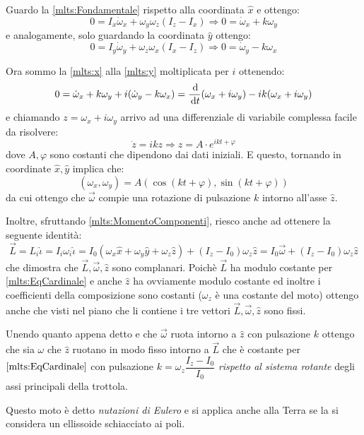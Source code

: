 \documentclass[../main.tex]{subfiles}
\begin{document}
Guardo la \cref{mlts:Fondamentale} rispetto alla coordinata $\hat x$ e ottengo:
\begin{equation}\label{mlts:x}
	0=I_x\dot\omega_x+\omega_y\omega_z(I_z-I_x)\Rightarrow 0=\dot\omega_x+k\omega_y
\end{equation}
e analogamente, solo guardando la coordinata $\hat y$ ottengo:
\begin{equation}\label{mlts:y}
	0=I_y\dot\omega_y+\omega_z\omega_x(I_x-I_z)\Rightarrow 0=\dot\omega_y-k\omega_x
\end{equation}

Ora sommo la \cref{mlts:x} alla \cref{mlts:y} moltiplicata per $i$ ottenendo:
\begin{equation*}
	0=\dot\omega_x+k\omega_y+i(\dot\omega_y-k\omega_x)=\frac{\,\mathrm{d}}{\,\mathrm{d} t}(\omega_x+i\omega_y)-ik(\omega_x+i\omega_y)
\end{equation*}
e chiamando $z=\omega_x+i\omega_y$ arrivo ad una differenziale di variabile complessa facile da risolvere:
\begin{equation*}
	\dot z=ikz \Rightarrow z=A\cdot e^{ikt+\varphi}
\end{equation*}
dove $A,\varphi$ sono costanti che dipendono dai dati iniziali. E questo, tornando in coordinate $\hat x,\hat y$ implica che:
\begin{equation}\label{mlts:MotoOmega}
	(\omega_x,\omega_y)=A(\cos(kt+\varphi),\sin(kt+\varphi))
\end{equation}
da cui ottengo che $\vec\omega$ compie una rotazione di pulsazione $k$ intorno all'asse $\hat z$.

Inoltre, sfruttando \cref{mlts:MomentoComponenti}, riesco anche ad ottenere la seguente identità:
\begin{equation}\label{mlts:Complanarita}
	\vec L = L_i\hat\iota = I_i \omega_i\hat\iota= 
	I_0\left(\omega_x\hat x+\omega_y\hat y+\omega_z\hat z\right)+(I_z-I_0)\omega_z \hat z=
	I_0\vec\omega + (I_z-I_0)\omega_z \hat z
\end{equation}
che dimostra che $\vec L,\vec\omega,\hat z$ sono complanari. Poichè $\vec L$ ha modulo costante per \cref{mlts:EqCardinale} e anche $\hat z$ ha ovviamente modulo costante ed inoltre i coefficienti della composizione sono costanti ($\omega_z$ è una costante del moto) ottengo anche che visti nel piano che li contiene i tre vettori $\vec L, \vec\omega, \hat z$ sono fissi.

Unendo quanto appena detto e che $\vec\omega$ ruota intorno a $\hat z$ con pulsazione $k$ ottengo che sia $\omega$ che $\hat z$ ruotano in modo fisso intorno a $\vec L$ che è costante per $\cref{mlts:EqCardinale}$ con pulsazione $k=\omega_z\dfrac{I_z-I_0}{I_0}$ \emph{rispetto al sistema rotante} degli assi principali della trottola.

Questo moto è detto \emph{nutazioni di Eulero} e si applica anche alla Terra se la si considera un ellissoide schiacciato ai poli.
\end{document}
